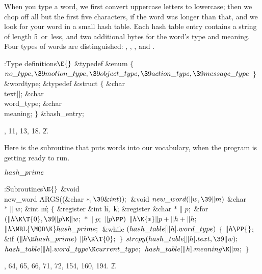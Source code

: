 \fi

When you type a word, we first convert uppercase letters to lowercase;
then
we chop off all but the first five characters, if the word was longer than
that, and we look for your word in a small hash table. Each hash table entry
contains a string of length 5~or~less, and two additional bytes for the word's
type and meaning. Four types of words are distinguished: ,
, , and .

\Y\B\4:Type definitions\X${}\E{}$\6
\&{typedef} \&{enum}\5
${}\{{}$\1\6
${}\\{no\_type},\39\\{motion\_type},\39\\{object\_type},\39\\{action\_type},\39%
\\{message\_type}{}$\2\6
${}\}{}$ \&{wordtype};\6
\&{typedef} \&{struct} ${}\{{}$\1\6
\&{char} \\{text}[];\6
\&{char} \\{word\_type};\6
\&{char} \\{meaning};\2\6
${}\}{}$ \&{hash\_entry};\par
{}, 11, 13, 18.
\U2.\fi

Here is the subroutine that puts words into our vocabulary, when the
program is getting ready to run.

\Y\B\4\D$\\{hash\_prime}$ \5
\par
\Y\B\4:Subroutines\X${}\E{}$\6
\&{void} \\{new\_word}\,\,\.{ARGS}((\&{char} ${}{*},\39\&{int}));{}$\7
\&{void} ${}\\{new\_word}(\|w,\39\|m){}$\1\1\6
\&{char} ${}{*}\|w{}$;\6
\&{int} \|m;\2\2\6
${}\{{}$\1\6
\&{register} \&{int} \|h${},{}$ \|k;\6
\&{register} \&{char} ${}{*}\|p;{}$\7
\&{for} ${}(\|h\K\T{0},\39\|p\K\|w;{}$ ${}{*}\|p;{}$ ${}\|p\PP){}$\1\5
${}\|h\K{*}\|p+\|h+\|h;{}$\2\6
${}\|h\MRL{{\MOD}{\K}}\\{hash\_prime};{}$\6
\&{while} ${}(\\{hash\_table}[\|h].\\{word\_type}){}$\5
${}\{{}$\1\6
${}\|h\PP{}$;\5
\&{if} ${}(\|h\E\\{hash\_prime}){}$\1\5
${}\|h\K\T{0};{}$\2\6
\4${}\}{}$\2\6
${}\\{strcpy}(\\{hash\_table}[\|h].\\{text},\39\|w);{}$\6
${}\\{hash\_table}[\|h].\\{word\_type}\K\\{current\_type};{}$\6
${}\\{hash\_table}[\|h].\\{meaning}\K\|m;{}$\6
\4${}\}{}$\2\par
{}, 64, 65, 66, 71, 72, 154, 160, 194.
\U2.\fi

